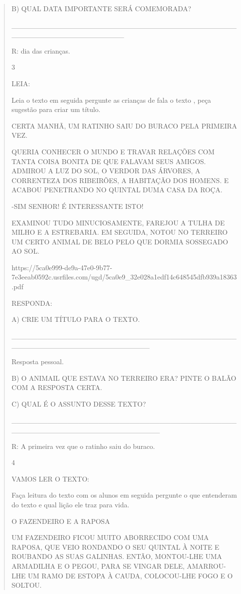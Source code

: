 {{{{\begin{verse}
{{\begin{escolha}
{{{{B) QUAL DATA IMPORTANTE SERÁ COMEMORADA?

\_\_\_\_\_\_\_\_\_\_\_\_\_\_\_\_\_\_\_\_\_\_\_\_\_\_\_\_\_\_\_\_\_\_\_\_\_\_\_\_\_\_\_\_\_\_\_\_\_\_\_\_\_\_\_\_\_\_\_\_\_\_\_\_\_\_

R: dia das crianças.

\num{3}

LEIA:

Leia o texto em seguida pergunte as crianças de fala o texto , peça
sugestão para criar um título.

CERTA MANHÃ, UM RATINHO SAIU DO BURACO PELA PRIMEIRA VEZ.

QUERIA CONHECER O MUNDO E TRAVAR RELAÇÕES COM TANTA COISA BONITA DE QUE
FALAVAM SEUS AMIGOS. ADMIROU A LUZ DO SOL, O VERDOR DAS ÁRVORES, A
CORRENTEZA DOS RIBEIRÕES, A HABITAÇÃO DOS HOMENS. E ACABOU PENETRANDO NO
QUINTAL DUMA CASA DA ROÇA.

-SIM SENHOR! É INTERESSANTE ISTO!

EXAMINOU TUDO MINUCIOSAMENTE, FAREJOU A TULHA DE MILHO E A ESTREBARIA.
EM SEGUIDA, NOTOU NO TERREIRO UM CERTO ANIMAL DE BELO PELO QUE DORMIA
SOSSEGADO AO SOL.

https://5ca0e999-de9a-47e0-9b77-7e3eeab0592c.usrfiles.com/ugd/5ca0e9\_32e028a1edf14c648545dfb939a18363.pdf

RESPONDA:

A) CRIE UM TÍTULO PARA O TEXTO.

\_\_\_\_\_\_\_\_\_\_\_\_\_\_\_\_\_\_\_\_\_\_\_\_\_\_\_\_\_\_\_\_\_\_\_\_\_\_\_\_\_\_\_\_\_\_\_\_\_\_\_\_\_\_\_\_\_\_\_\_\_\_\_\_\_\_\_\_\_\_\_

Resposta pessoal.

B) O ANIMAIL QUE ESTAVA NO TERREIRO ERA? PINTE O BALÃO COM A RESPOSTA
CERTA.

C) QUAL É O ASSUNTO DESSE TEXTO?

\_\_\_\_\_\_\_\_\_\_\_\_\_\_\_\_\_\_\_\_\_\_\_\_\_\_\_\_\_\_\_\_\_\_\_\_\_\_\_\_\_\_\_\_\_\_\_\_\_\_\_\_\_\_\_\_\_\_\_\_\_\_\_\_\_\_\_\_\_\_\_\_\_

R: A primeira vez que o ratinho saiu do buraco.

\num{4}

VAMOS LER O TEXTO:

Faça leitura do texto com os alunos em seguida pergunte o que entenderam
do texto e qual lição ele traz para vida.

O FAZENDEIRO E A RAPOSA

UM FAZENDEIRO FICOU MUITO ABORRECIDO COM UMA RAPOSA, QUE VEIO RONDANDO O
SEU QUINTAL À NOITE E ROUBANDO AS SUAS GALINHAS. ENTÃO, MONTOU-LHE UMA
ARMADILHA E O PEGOU, PARA SE VINGAR DELE, AMARROU-LHE UM RAMO DE ESTOPA
À CAUDA, COLOCOU-LHE FOGO E O SOLTOU.

}}}}
\end{escolha}}}
\end{verse}}}}}
